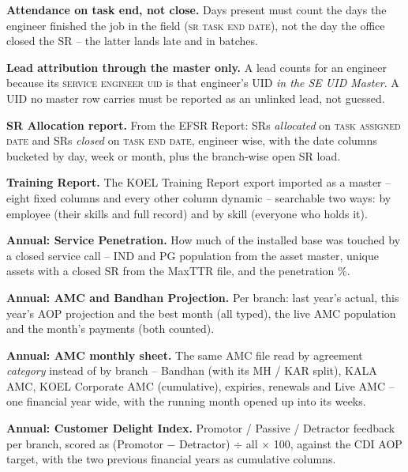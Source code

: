\documentclass[11pt,a4paper]{article}
\newcommand{\col}[1]{\textsc{\small #1}}
\begin{document}
\begin{reqlist}
\item \textbf{Attendance on task end, not close.} Days present must count the days the
engineer finished the job in the field (\col{sr task end date}), not the day the office
closed the SR -- the latter lands late and in batches.

\item \textbf{Lead attribution through the master only.} A lead counts for an engineer
because its \col{service engineer uid} is that engineer's UID \emph{in the SE UID Master}.
A UID no master row carries must be reported as an unlinked lead, not guessed.

\item \textbf{SR Allocation report.} From the EFSR Report: SRs \emph{allocated} on
\col{task assigned date} and SRs \emph{closed} on \col{task end date}, engineer wise, with
the date columns bucketed by day, week or month, plus the branch-wise open SR load.

\item \textbf{Training Report.} The KOEL Training Report export imported as a master --
eight fixed columns and every other column dynamic -- searchable two ways: by employee
(their skills and full record) and by skill (everyone who holds it).

\item \textbf{Annual: Service Penetration.} How much of the installed base was touched by
a closed service call -- IND and PG population from the asset master, unique assets with a
closed SR from the MaxTTR file, and the penetration \%.

\item \textbf{Annual: AMC and Bandhan Projection.} Per branch: last year's actual, this
year's AOP projection and the best month (all typed), the live AMC population and the
month's payments (both counted).

\item \textbf{Annual: AMC monthly sheet.} The same AMC file read by agreement
\emph{category} instead of by branch -- Bandhan (with its MH / KAR split), KALA AMC, KOEL
Corporate AMC (cumulative), expiries, renewals and Live AMC -- one financial year wide,
with the running month opened up into its weeks.

\item \textbf{Annual: Customer Delight Index.} Promotor / Passive / Detractor feedback per
branch, scored as (Promotor $-$ Detractor) $\div$ all $\times$ 100, against the CDI AOP
target, with the two previous financial years as cumulative columns.


\end{reqlist}
\end{document}
